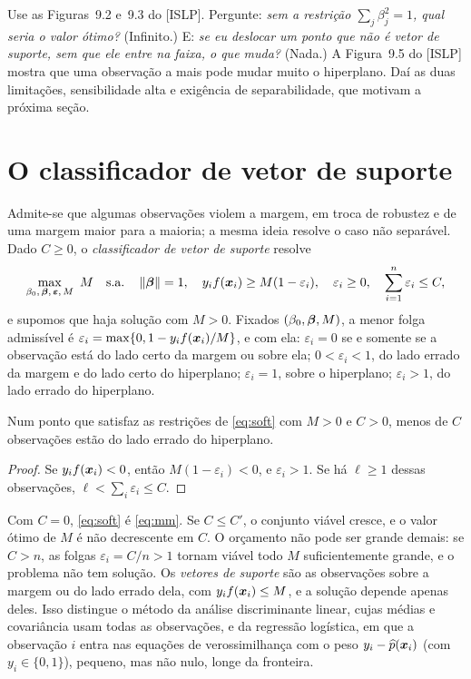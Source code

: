 \documentclass[11pt,a4paper]{article}
\begin{document}
\begin{emsala}
Use as Figuras~9.2 e~9.3 do [ISLP]. Pergunte: \emph{sem a restrição
$\sum_j\beta_j^2=1$, qual seria o valor ótimo?} (Infinito.) E: \emph{se eu deslocar
um ponto que não é vetor de suporte, sem que ele entre na faixa, o que muda?} (Nada.)
A Figura~9.5 do [ISLP] mostra que uma observação a mais pode mudar muito o
hiperplano. Daí as duas limitações, sensibilidade alta e exigência de
separabilidade, que motivam a próxima seção.
\end{emsala}

\section{O classificador de vetor de suporte}
Admite-se que algumas observações violem a margem, em troca de robustez e de uma
margem maior para a maioria; a mesma ideia resolve o caso não separável. Dado
$C\ge0$, o \emph{classificador de vetor de suporte} resolve
\begin{equation}\label{eq:soft}
  \max_{\beta_0,\,\bm{\beta},\,\bm\varepsilon,\,M}\ M
  \quad\text{s.a.}\quad
  \left\lVert \bm{\beta} \right\rVert=1,\quad
  y_if(\bm{x}_i)\ge M(1-\varepsilon_i),\quad
  \varepsilon_i\ge0,\quad \sum_{i=1}^n\varepsilon_i\le C,
\end{equation}
e supomos que haja solução com $M>0$. Fixados $(\beta_0,\bm{\beta},M)$, a menor folga
admissível é $\varepsilon_i=\max\{0,1-y_if(\bm{x}_i)/M\}$, e com ela:
$\varepsilon_i=0$ se e somente se a observação está do lado certo da margem ou sobre
ela; $0<\varepsilon_i<1$, do lado errado da margem e do lado certo do hiperplano;
$\varepsilon_i=1$, sobre o hiperplano; $\varepsilon_i>1$, do lado errado do
hiperplano.

\begin{proposicao}\label{prop:erros}
Num ponto que satisfaz as restrições de \eqref{eq:soft} com $M>0$ e $C>0$, menos de
$C$ observações estão do lado errado do hiperplano.
\end{proposicao}
\begin{proof}
Se $y_if(\bm{x}_i)<0$, então $M(1-\varepsilon_i)<0$, e $\varepsilon_i>1$. Se há
$\ell\ge1$ dessas observações, $\ell<\sum_i\varepsilon_i\le C$.
\end{proof}

Com $C=0$, \eqref{eq:soft} é \eqref{eq:mm}. Se $C\le C'$, o conjunto viável cresce, e
o valor ótimo de $M$ é não decrescente em $C$. O orçamento não pode ser grande
demais: se $C>n$, as folgas $\varepsilon_i=C/n>1$ tornam viável todo $M$
suficientemente grande, e o problema não tem solução. Os \emph{vetores de suporte}
são as observações sobre a margem ou do lado errado dela, com $y_if(\bm{x}_i)\le M$, e a
solução depende apenas deles. Isso distingue o método da análise discriminante
linear, cujas médias e covariância usam todas as observações, e da regressão
logística, em que a observação $i$ entra nas equações de verossimilhança com o peso
$y_i-\widehat p(\bm{x}_i)$ (com $y_i\in\{0,1\}$), pequeno, mas não nulo, longe da
fronteira.
\end{document}
